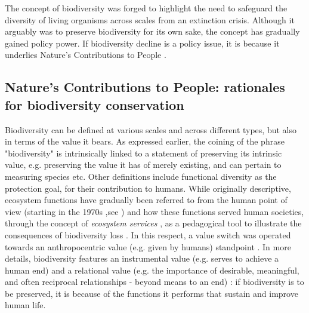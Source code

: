 The concept of biodiversity was forged to highlight the need to safeguard the diversity of living organisms across scales from an extinction crisis. Although it arguably was to preserve biodiversity for its own sake, the concept has gradually gained policy power. If biodiversity decline is a policy issue, it is because it underlies Nature's Contributions to People \citep{DIAZ20151}.

\subsection*{Nature's Contributions to People: rationales for biodiversity conservation}

Biodiversity can be defined at various scales and across different types, but also in terms of the value it bears. As expressed earlier, the coining of the phrase "biodiversity" is intrinsically linked to a statement of preserving its intrinsic value, e.g. preserving the value it has of merely existing, and can pertain to measuring species etc. Other definitions include functional diversity as the protection goal, for their contribution to humans. While originally descriptive, ecosystem functions have gradually been referred to from the human point of view (starting in the 1970s ,see \cite{hueting1969functions, schumacher1973small}) and how these functions served human societies, through the concept of \textit{ecosystem services} \citep{ehrlich1981extinction}, as a pedagogical tool to illustrate the consequences of biodiversity loss \citep{gomez_history_2010}.  In this respect, a value switch was operated towards an anthropocentric value (e.g. given by humans) standpoint \citep{mouysset_diversity_2023}. In more details, biodiversity features an instrumental value (e.g. serves to achieve a human end) and a relational value (e.g. the importance of desirable, meaningful, and often reciprocal relationships - beyond means to an end) : if biodiversity is to be preserved, it is because of the functions it performs that sustain and improve human life.

